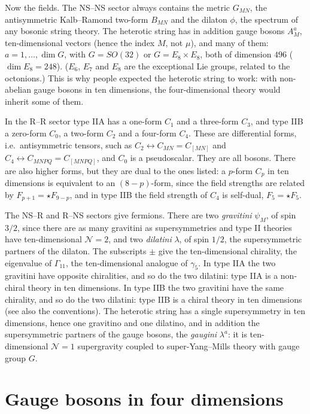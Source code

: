 Now the fields. The NS--NS sector always contains the metric $G_{MN}$, the antisymmetric Kalb--Ramond two-form $B_{MN}$ and the dilaton $\phi$, the spectrum of any bosonic string theory. The heterotic string has in addition gauge bosons $A^a_M$, ten-dimensional vectors (hence the index $M$, not $\mu$), and many of them: $a = 1,\dots,\dim G$, with $G = SO(32)$ or $G = E_8\times E_8$, both of dimension $496$ ($\dim E_8 = 248$). ($E_6$, $E_7$ and $E_8$ are the exceptional Lie groups, related to the octonions.) This is why people expected the heterotic string to work: with non-abelian gauge bosons in ten dimensions, the four-dimensional theory would inherit some of them.

In the R--R sector type IIA has a one-form $C_1$ and a three-form $C_3$, and type IIB a zero-form $C_0$, a two-form $C_2$ and a four-form $C_4$. These are differential forms, i.e.\ antisymmetric tensors, such as $C_2\leftrightarrow C_{MN} = C_{[MN]}$ and $C_4\leftrightarrow C_{MNPQ} = C_{[MNPQ]}$, and $C_0$ is a pseudoscalar. They are all bosons. There are also higher forms, but they are dual to the ones listed: a $p$-form $C_p$ in ten dimensions is equivalent to an $(8-p)$-form, since the field strengths are related by $F_{p+1} = \star F_{9-p}$, and in type IIB the field strength of $C_4$ is self-dual, $F_5 = \star F_5$.

The NS--R and R--NS sectors give fermions. There are two \emph{gravitini} $\psi_M$, of spin $3/2$, since there are as many gravitini as supersymmetries and type II theories have ten-dimensional $\mathcal N=2$, and two \emph{dilatini} $\lambda$, of spin $1/2$, the supersymmetric partners of the dilaton. The subscripts $\pm$ give the ten-dimensional chirality, the eigenvalue of $\Gamma_{11}$, the ten-dimensional analogue of $\gamma_5$. In type IIA the two gravitini have opposite chiralities, and so do the two dilatini: type IIA is a non-chiral theory in ten dimensions. In type IIB the two gravitini have the same chirality, and so do the two dilatini: type IIB is a chiral theory in ten dimensions (see also the conventions). The heterotic string has a single supersymmetry in ten dimensions, hence one gravitino and one dilatino, and in addition the supersymmetric partners of the gauge bosons, the \emph{gaugini} $\lambda^a$: it is ten-dimensional $\mathcal N=1$ supergravity coupled to super-Yang--Mills theory with gauge group $G$.

\section{Gauge bosons in four dimensions}
\label{sec:L2-vectors}

